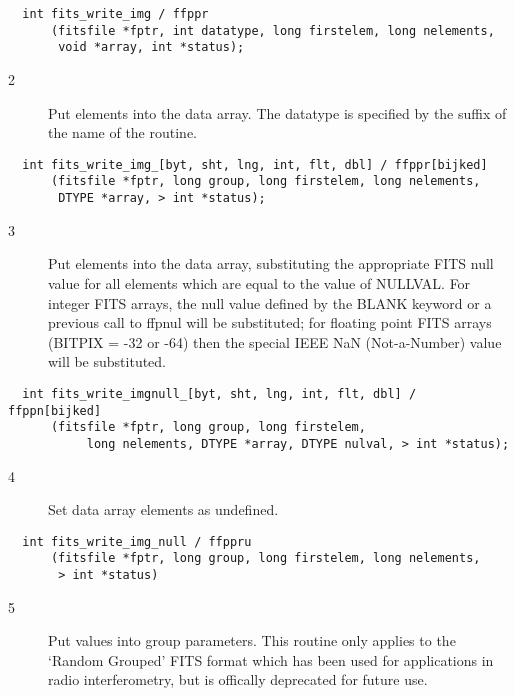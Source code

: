 \begin{verbatim}
  int fits_write_img / ffppr
      (fitsfile *fptr, int datatype, long firstelem, long nelements,
       void *array, int *status);
\end{verbatim}

\begin{description}
\item[2 ] Put elements into the data array.  The datatype is specified
   by the suffix of the name of the routine.
\end{description}

\begin{verbatim}
  int fits_write_img_[byt, sht, lng, int, flt, dbl] / ffppr[bijked]
      (fitsfile *fptr, long group, long firstelem, long nelements,
       DTYPE *array, > int *status);
\end{verbatim}

\begin{description}
\item[3 ]Put elements into the data array, substituting the appropriate FITS null
   value for all elements which are equal to the value of NULLVAL.  For
   integer FITS arrays, the null value defined by the BLANK keyword or
   a previous call to ffpnul
   will be substituted;  for floating point FITS arrays (BITPIX = -32
   or -64) then the special IEEE NaN (Not-a-Number) value will be
  substituted.
\end{description}

\begin{verbatim}
  int fits_write_imgnull_[byt, sht, lng, int, flt, dbl] / ffppn[bijked]
      (fitsfile *fptr, long group, long firstelem,
           long nelements, DTYPE *array, DTYPE nulval, > int *status);
\end{verbatim}

\begin{description}
\item[4 ]Set data array elements as undefined.
\end{description}

\begin{verbatim}
  int fits_write_img_null / ffppru
      (fitsfile *fptr, long group, long firstelem, long nelements,
       > int *status)
\end{verbatim}

\begin{description}
\item[5 ] Put values into group parameters.  This routine only applies
    to the `Random Grouped' FITS format which has been used for
    applications in radio interferometry, but is offically deprecated
   for future use.
\end{description}


